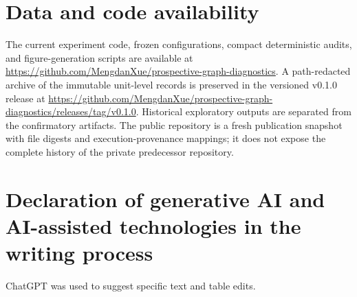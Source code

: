 \documentclass[preprint,12pt]{elsarticle}
\begin{document}








\appendix
\setcounter{table}{0}


\section*{Data and code availability}
\begin{sloppypar}
The current experiment code, frozen configurations, compact deterministic audits, and figure-generation scripts are available at \url{https://github.com/MengdanXue/prospective-graph-diagnostics}. A path-redacted archive of the immutable unit-level records is preserved in the versioned v0.1.0 release at \url{https://github.com/MengdanXue/prospective-graph-diagnostics/releases/tag/v0.1.0}. Historical exploratory outputs are separated from the confirmatory artifacts. The public repository is a fresh publication snapshot with file digests and execution-provenance mappings; it does not expose the complete history of the private predecessor repository.
\end{sloppypar}

\section*{Declaration of generative AI and AI-assisted technologies in the writing process}
ChatGPT was used to suggest specific text and table edits.



\end{document}
